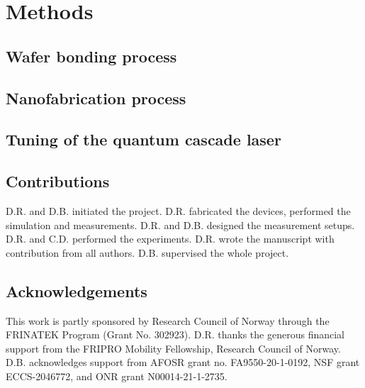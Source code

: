 \documentclass[fleqn,10pt,twocolumn]{wlscirep}
\begin{document}
\ifpreprint \else
    \section*{Methods}
    \subsection*{Wafer bonding process} \waferbonding
    \subsection*{Nanofabrication process} \nanofab
    \subsection*{Tuning of the quantum cascade laser} \dfbtuning
    \subsection*{Contributions}
    D.R. and D.B. initiated the project. D.R. fabricated the devices, performed the simulation and measurements. D.R. and D.B. designed the measurement setups.  D.R. and C.D. performed the experiments. D.R. wrote the manuscript with contribution from all authors. D.B. supervised the whole project.
\fi

\subsection*{Acknowledgements}
This work is partly sponsored by Research Council of Norway through the FRINATEK Program (Grant No. 302923). D.R. thanks the generous financial support from the FRIPRO Mobility Fellowship, Research Council of Norway. D.B. acknowledges support from AFOSR grant no. FA9550-20-1-0192, NSF grant ECCS-2046772, and ONR grant N00014-21-1-2735.


\end{document}
